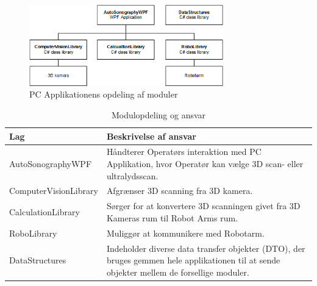 \begin{figure}[H]
    \centering
    \includegraphics[width=0.75\textwidth]{figurer/d/Design/Layers}
    \caption{PC Applikationens opdeling af moduler}
    \label{Layers}
\end{figure}


\begin{table}[htb]
\begin{tabular}{ | l | p{} | }
\hline
\textbf{Lag} & \textbf{Beskrivelse af ansvar} \\\hline
AutoSonographyWPF & Håndterer Operatørs interaktion med PC Applikation, hvor Operatør kan vælge 3D scan- eller ultralydsscan.\\\hline
ComputerVisionLibrary & Afgrænser 3D scanning fra  3D kamera. \\\hline
CalculationLibrary & Sørger for at konvertere 3D scanningen givet fra 3D Kameras rum til Robot Arms rum. \\\hline
RoboLibrary & Muliggør at kommunikere med Robotarm.\\\hline
DataStructures & Indeholder diverse data transfer objekter (DTO), der bruges gemmen hele applikationen til at sende objekter mellem de forsellige moduler.\\\hline
\end{tabular}
\caption{Modulopdeling og ansvar}
\end{table}
